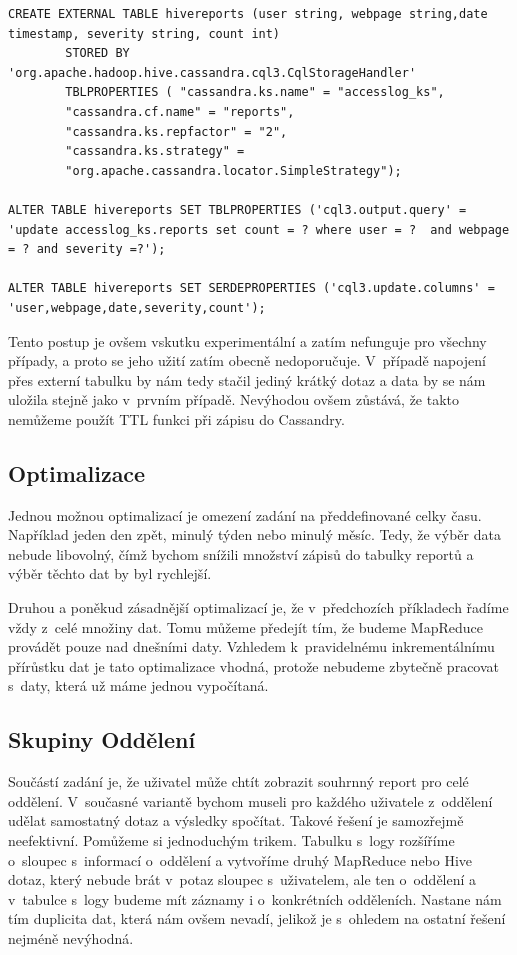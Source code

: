 \begin{lstlisting}[caption={Vytvoření externí tabulky napojené na tabulku v~CQL},label=Hive2]
CREATE EXTERNAL TABLE hivereports (user string, webpage string,date timestamp, severity string, count int)
        STORED BY 'org.apache.hadoop.hive.cassandra.cql3.CqlStorageHandler'
        TBLPROPERTIES ( "cassandra.ks.name" = "accesslog_ks",
        "cassandra.cf.name" = "reports",
        "cassandra.ks.repfactor" = "2",
        "cassandra.ks.strategy" =
        "org.apache.cassandra.locator.SimpleStrategy");
    
ALTER TABLE hivereports SET TBLPROPERTIES ('cql3.output.query' = 'update accesslog_ks.reports set count = ? where user = ?  and webpage = ? and severity =?');
    
ALTER TABLE hivereports SET SERDEPROPERTIES ('cql3.update.columns' = 'user,webpage,date,severity,count');
\end{lstlisting}

Tento postup je ovšem vskutku experimentální a zatím nefunguje pro všechny případy, a proto se jeho užití zatím obecně nedoporučuje. V~případě napojení přes externí tabulku by nám tedy stačil jediný krátký dotaz a data by se nám uložila stejně jako v~prvním případě. Nevýhodou ovšem zůstává, že takto nemůžeme použít TTL funkci při zápisu do Cassandry.

\subsection{Optimalizace}
Jednou možnou optimalizací je omezení zadání na předdefinované celky času. Například jeden den zpět, minulý týden nebo minulý měsíc. Tedy, že výběr data nebude libovolný, čímž bychom snížili množství zápisů do tabulky reportů a výběr těchto dat by byl rychlejší. 

Druhou a poněkud zásadnější optimalizací je, že v~předchozích příkladech řadíme vždy z~celé množiny dat. Tomu můžeme předejít tím, že budeme MapReduce provádět pouze nad dnešními daty. Vzhledem k~pravidelnému inkrementálnímu přírůstku dat je tato optimalizace vhodná, protože nebudeme zbytečně pracovat s~daty, která už máme jednou vypočítaná. 

\subsection{Skupiny Oddělení}
Součástí zadání je, že uživatel může chtít zobrazit souhrnný report pro celé oddělení. V~současné variantě bychom museli pro každého uživatele z~oddělení udělat samostatný dotaz a výsledky spočítat. Takové řešení je samozřejmě neefektivní. Pomůžeme si jednoduchým trikem. Tabulku s~logy rozšíříme o~sloupec s~informací o~oddělení a vytvoříme druhý MapReduce nebo Hive dotaz, který nebude brát v~potaz sloupec s~uživatelem, ale ten o~oddělení a v~tabulce s~logy budeme mít záznamy i o~konkrétních odděleních. Nastane nám tím duplicita dat, která nám ovšem nevadí, jelikož je s~ohledem na ostatní řešení nejméně nevýhodná. 

